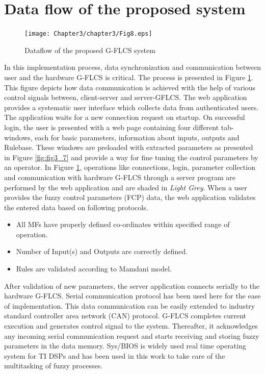 \section{Data flow of the proposed system}
\begin{figure}[h!]
	\centering
	\texttt{[image: Chapter3/chapter3/Fig8.eps]}
	\caption{Dataflow of the proposed G-FLCS system}
	\label{fig:fig3_8}
\end{figure}
In this implementation process, data synchronization and communication between user and the hardware G-FLCS is critical. The process is presented in Figure \ref{fig:fig3_8}. This figure depicts how data communication is achieved with the help of various control signals between, client-server and server-GFLCS. The web application provides a systematic user interface which collects data from authenticated users. The application waits for a new connection request on startup. On successful login, the user is presented with a web page containing four different tab-windows, each for basic parameters, information about inputs, outputs and Rulebase. These windows are preloaded with extracted parameters as presented in Figure \ref{fig:fig3_7} and provide a way for fine tuning the control parameters by an operator. In Figure \ref{fig:fig3_8}, operations like connections, login, parameter collection and communication with hardware G-FLCS through a server program are performed by the web application and are shaded in \textit{Light Grey}. 
When a user provides the fuzzy control parameters (FCP) data, the web application validates the entered data based on following protocols.
\begin{itemize}
	\item All MFs have properly defined co-ordinates within specified range of operation.
	\item Number of Input(s) and Outputs are correctly defined. 
	\item Rules are validated according to Mamdani model.
\end{itemize}
After validation of new parameters, the server application connects serially to the hardware G-FLCS. Serial communication protocol has been used here for the ease of implementation. This data communication can be easily extended to industry standard controller area network (CAN) protocol. G-FLCS completes current execution and generates control signal to the system. Thereafter, it acknowledges any incoming serial communication request and starts receiving and storing fuzzy parameters in the data memory. Sys/BIOS is widely used real time operating system for TI DSPs and has been used in this work to take care of the multitasking of fuzzy processes.


